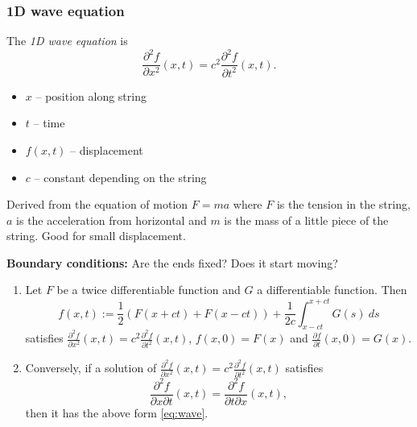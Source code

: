 \subsubsection*{1D wave equation}

The \emph{1D wave equation} is
\[
    \frac{\partial^2 f}{\partial x^2}(x,t) = c^2  \frac{\partial^2 f}{\partial t^2}(x,t).
\]
\begin{itemize}
    \item  \(x\) -- position along string
    \item \(t\) -- time
    \item \(f(x,t)\) -- displacement
    \item \(c\) -- constant depending on the string
\end{itemize}

Derived from the equation of motion \(F = m a\) where \(F\) is the tension in the string, \(a\) is the acceleration from horizontal and \(m\) is the mass of a little piece of the string.
Good for small displacement.

\textbf{Boundary conditions:}
Are the ends fixed? Does it start moving?

\begin{theorem}
    \begin{enumerate}
        \item
              Let \(F\) be a twice differentiable function and \(G\) a differentiable function. Then
              \begin{equation}
                  \label{eq:wave}
                  f(x,t) := \frac{1}{2}(F(x+ct) + F(x-ct)) + \frac{1}{2c} \int_{x-ct}^{x+ct} G(s) \ ds
              \end{equation}
              satisfies \(   \frac{\partial^2 f}{\partial x^2}(x,t) = c^2  \frac{\partial^2 f}{\partial t^2}(x,t) \),
              \(f(x,0) = F(x)\)
              and \(\frac{\partial f}{\partial t}(x,0) = G(x)\).
        \item
              Conversely, if a solution of  \(   \frac{\partial^2 f}{\partial x^2}(x,t) = c^2  \frac{\partial^2 f}{\partial t^2}(x,t) \) satisfies
              \[\frac{\partial^2 f}{\partial x \partial t}(x,t) = \frac{\partial^2 f}{\partial t \partial x}(x,t),\]
              then it has the above form \eqref{eq:wave}.
    \end{enumerate}

\end{theorem}


